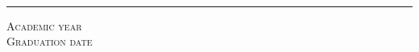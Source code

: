 \begin{titlepage}
    \vspace*{3.5cm}
    \begin{normalsize}
      \noindent
      \makebox[\textwidth][c]{ }%
      \\[0cm]
	  \end{normalsize} 
    \begin{large}
      \noindent
      \makebox[0pt][l]{\@author}%
      \makebox[\textwidth][c]{ }%
      \\[0cm]
    \end{large}
    \begin{normalsize}
      \noindent
      \makebox[0pt][l]{}%
      \makebox[\textwidth][c]{ }%
  		\\[.3cm]
    \end{normalsize}
    \begin{normalsize}
      \noindent
      \makebox[0pt][l]{\textit{}}%
      \makebox[\textwidth][c]{ }%
      \\[0cm]
	  \end{normalsize} 
    \begin{large}
      \noindent
      \makebox[0pt][l]{}%
      \makebox[\textwidth][c]{ }%
      \\[0cm]
    \end{large}
    \begin{normalsize}
      \noindent
      \makebox[0pt][l]{}%
      \makebox[\textwidth][c]{ }%
      \\[0cm]
    \end{normalsize}
	\begin{center}
  
    \vspace{-1cm}
    \vfill
    \noindent\rule{\textwidth}{0.5pt}
    \begin{normalsize}
    \textsc{Academic year}\\
    \textsc{Graduation date}\\
    \end{normalsize}
  \end{center}
  \makeatother
\end{titlepage}
